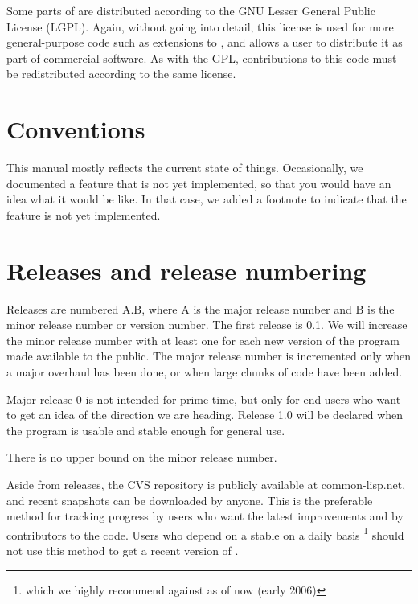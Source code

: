 Some parts of \sysname{} are distributed according to the GNU Lesser
General Public License (LGPL).  Again, without going into detail, this
license is used for more general-purpose code such as extensions to
{\clim}, and allows a user to distribute it as part of commercial
software.  As with the GPL, contributions to this code must be
redistributed according to the same license. 


\section{Conventions}

This manual mostly reflects the current state of things.  Occasionally,
we documented a feature that is not yet implemented, so that you would
have an idea what it would be like.  In that case, we added a footnote
to indicate that the feature is not yet implemented. 

\section{Releases and release numbering}

Releases are numbered A.B, where A is the major release number and B
is the minor release number or version number.  The first release is
0.1.  We will increase the minor release number with at least one for
each new version of the program made available to the public.  The
major release number is incremented only when a major overhaul has
been done, or when large chunks of code have been added.  

Major release 0 is not intended for prime time, but only for end users
who want to get an idea of the direction we are heading.  Release 1.0
will be declared when the program is usable and stable enough for
general use. 

There is no upper bound on the minor release number.

Aside from releases, the CVS repository is publicly available at
common-lisp.net, and recent snapshots can be downloaded by anyone.  
This is the preferable method for tracking \sysname{} progress by users who
want the latest improvements and by contributors to the \sysname{} code.
Users who depend on a stable \sysname{} on a daily basis \footnote{which we
  highly recommend against as of now (early 2006)} should not use this
method to get a recent version of \sysname{}.

